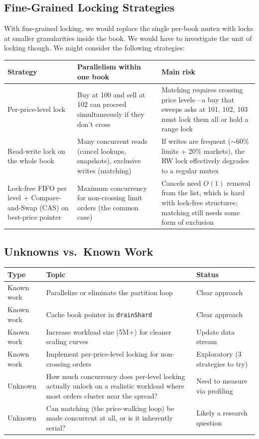 \documentclass[11pt]{article}
\begin{document}
\subsection*{Fine-Grained Locking Strategies}

With fine-grained locking, we would replace the single per-book mutex with locks at smaller granularities inside the book. We would have to investigate the unit of locking though. We might consider the following strategies:
\begin{table}[h]
\centering
\begin{tabular}{p{3.8cm} p{5cm} p{5.5cm}}
\toprule
\textbf{Strategy} & \textbf{Parallelism within one book} & \textbf{Main risk} \\
\midrule
Per-price-level lock & Buy at 100 and sell at 102 can proceed simultaneously if they don't cross & Matching requires crossing price levels---a buy that sweeps asks at 101, 102, 103 must lock them all or hold a range lock \\
\addlinespace
Read-write lock on the whole book & Many concurrent reads (cancel lookups, snapshots), exclusive writes (matching) & If writes are frequent ($\sim$60\% limits + 20\% markets), the RW lock effectively degrades to a regular mutex \\
\addlinespace
Lock-free FIFO per level + Compare-and-Swap (CAS) on best-price pointer & Maximum concurrency for non-crossing limit orders (the common case) & Cancels need $O(1)$ removal from the list, which is hard with lock-free structures; matching still needs some form of exclusion \\
\bottomrule
\end{tabular}
\end{table}

\subsection*{Unknowns vs.\ Known Work}

\begin{table}[h]
\centering
\begin{tabular}{p{2cm} p{7.5cm} p{4.5cm}}
\toprule
\textbf{Type} & \textbf{Topic} & \textbf{Status} \\
\midrule
Known work & Parallelize or eliminate the partition loop & Clear approach \\
Known work & Cache book pointer in \texttt{drainShard} & Clear approach \\
Known work & Increase workload size (5M+) for cleaner scaling curves & Update data stream \\
Known work & Implement per-price-level locking for non-crossing orders & Exploratory (3 strategies to try) \\
\addlinespace
Unknown & How much concurrency does per-level locking actually unlock on a realistic workload where most orders cluster near the spread? & Need to measure via profiling \\
Unknown & Can matching (the price-walking loop) be made concurrent at all, or is it inherently serial? & Likely a research question \\
\bottomrule
\end{tabular}
\end{table}
\end{document}

